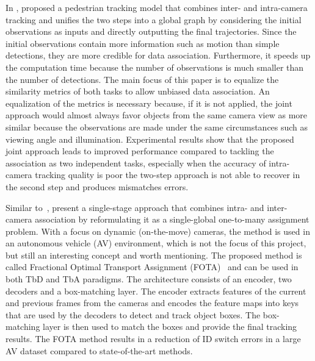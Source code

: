 In \citeyear{Chen17a}, \textcite{Chen17a} proposed a pedestrian tracking model that combines inter- and intra-camera tracking and unifies the two steps into a global graph by considering the initial observations as inputs and directly outputting the final trajectories. Since the initial observations contain more information such as motion than simple detections, they are more credible for data association. Furthermore, it speeds up the computation time because the number of observations is much smaller than the number of detections. The main focus of this paper is to equalize the similarity metrics of both tasks to allow unbiased data association. An equalization of the metrics is necessary because, if it is not applied, the joint approach would almost always favor objects from the same camera view as more similar because the observations are made under the same circumstances such as viewing angle and illumination. Experimental results show that the proposed joint approach leads to improved performance compared to tackling the association as two independent tasks, especially when the accuracy of intra-camera tracking quality is poor the two-step approach is not able to recover in the second step and produces mismatches errors.

Similar to~\cite{Chen17a}, \citeauthor{Nguyen22b} present a single-stage approach that combines intra- and inter-camera association by reformulating it as a single-global one-to-many assignment problem. With a focus on dynamic (on-the-move) cameras, the method is used in an autonomous vehicle (AV) environment, which is not the focus of this project, but still an interesting concept and worth mentioning. The proposed method is called Fractional Optimal Transport Assignment (FOTA)~\cite{Nguyen22b} and can be used in both TbD and TbA paradigms. The architecture consists of an encoder, two decoders and a box-matching layer. The encoder extracts features of the current and previous frames from the cameras and encodes the feature maps into keys that are used by the decoders to detect and track object boxes. The box-matching layer is then used to match the boxes and provide the final tracking results. The FOTA method results in a reduction of ID switch errors in a large AV dataset compared to state-of-the-art methods.

